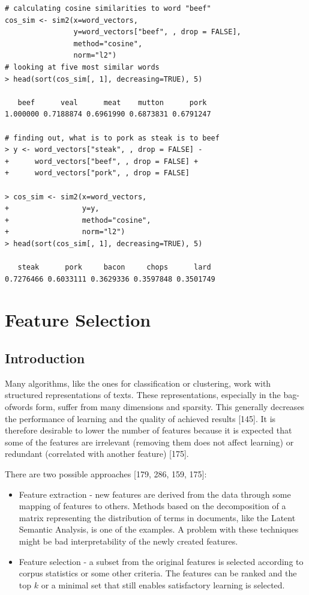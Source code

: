 \documentclass[11pt,openany,executivepaper]{book}
\begin{document}
\begin{verbatim}
# calculating cosine similarities to word "beef"
cos_sim <- sim2(x=word_vectors,
                y=word_vectors["beef", , drop = FALSE],
                method="cosine",
                norm="l2")
# looking at five most similar words
> head(sort(cos_sim[, 1], decreasing=TRUE), 5)

   beef      veal      meat    mutton      pork 
1.000000 0.7188874 0.6961990 0.6873831 0.6791247 

# finding out, what is to pork as steak is to beef
> y <- word_vectors["steak", , drop = FALSE] -
+      word_vectors["beef", , drop = FALSE] +
+      word_vectors["pork", , drop = FALSE]

> cos_sim <- sim2(x=word_vectors,
+                 y=y,
+                 method="cosine",
+                 norm="l2")
> head(sort(cos_sim[, 1], decreasing=TRUE), 5)

   steak      pork     bacon     chops      lard 
0.7276466 0.6033111 0.3629336 0.3597848 0.3501749 
\end{verbatim}



\chapter{Feature Selection}
\section{Introduction}
Many algorithms, like the ones for classification or clustering, work with structured representations of texts. These representations, especially in the bag-ofwords form, suffer from many dimensions and sparsity. This generally decreases the performance of learning and the quality of achieved results [145]. It is therefore desirable to lower the number of features because it is expected that some of the features are irrelevant (removing them does not affect learning) or redundant (correlated with another feature) [175].

There are two possible approaches [179, 286, 159, 175]:

\begin{itemize}
  \item Feature extraction - new features are derived from the data through some mapping of features to others. Methods based on the decomposition of a matrix representing the distribution of terms in documents, like the Latent Semantic Analysis, is one of the examples. A problem with these techniques might be bad interpretability of the newly created features.
  \item Feature selection - a subset from the original features is selected according to corpus statistics or some other criteria. The features can be ranked and the top $k$ or a minimal set that still enables satisfactory learning is selected.
\end{itemize}
\end{document}
